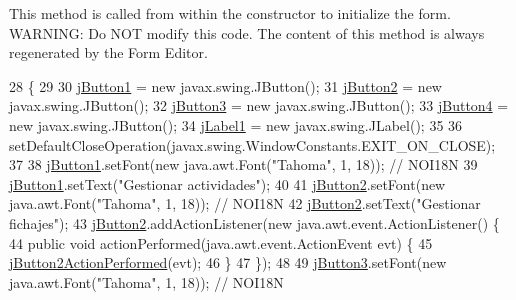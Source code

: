 This method is called from within the constructor to initialize the form. W\+A\+R\+N\+I\+NG\+: Do N\+OT modify this code. The content of this method is always regenerated by the Form Editor. 
\begin{DoxyCode}
28                                   \{
29 
30         \mbox{\hyperlink{classinterfacessoguar_1_1encargado_a5c4a8d1db3281eae3c5b8f19262b20c3}{jButton1}} = \textcolor{keyword}{new} javax.swing.JButton();
31         \mbox{\hyperlink{classinterfacessoguar_1_1encargado_a1f39888fb096cb2dd2e874f7e05f05b5}{jButton2}} = \textcolor{keyword}{new} javax.swing.JButton();
32         \mbox{\hyperlink{classinterfacessoguar_1_1encargado_a44f99cceb2a2d736508b0249e1ad447e}{jButton3}} = \textcolor{keyword}{new} javax.swing.JButton();
33         \mbox{\hyperlink{classinterfacessoguar_1_1encargado_ada21ea49d21b7b6bdd43b2a7c584450d}{jButton4}} = \textcolor{keyword}{new} javax.swing.JButton();
34         \mbox{\hyperlink{classinterfacessoguar_1_1encargado_a1b1ad6a8d2b52a465c2daf3b4409c9ed}{jLabel1}} = \textcolor{keyword}{new} javax.swing.JLabel();
35 
36         setDefaultCloseOperation(javax.swing.WindowConstants.EXIT\_ON\_CLOSE);
37 
38         \mbox{\hyperlink{classinterfacessoguar_1_1encargado_a5c4a8d1db3281eae3c5b8f19262b20c3}{jButton1}}.setFont(\textcolor{keyword}{new} java.awt.Font(\textcolor{stringliteral}{"Tahoma"}, 1, 18)); \textcolor{comment}{// NOI18N}
39         \mbox{\hyperlink{classinterfacessoguar_1_1encargado_a5c4a8d1db3281eae3c5b8f19262b20c3}{jButton1}}.setText(\textcolor{stringliteral}{"Gestionar actividades"});
40 
41         \mbox{\hyperlink{classinterfacessoguar_1_1encargado_a1f39888fb096cb2dd2e874f7e05f05b5}{jButton2}}.setFont(\textcolor{keyword}{new} java.awt.Font(\textcolor{stringliteral}{"Tahoma"}, 1, 18)); \textcolor{comment}{// NOI18N}
42         \mbox{\hyperlink{classinterfacessoguar_1_1encargado_a1f39888fb096cb2dd2e874f7e05f05b5}{jButton2}}.setText(\textcolor{stringliteral}{"Gestionar fichajes"});
43         \mbox{\hyperlink{classinterfacessoguar_1_1encargado_a1f39888fb096cb2dd2e874f7e05f05b5}{jButton2}}.addActionListener(\textcolor{keyword}{new} java.awt.event.ActionListener() \{
44             \textcolor{keyword}{public} \textcolor{keywordtype}{void} actionPerformed(java.awt.event.ActionEvent evt) \{
45                 \mbox{\hyperlink{classinterfacessoguar_1_1encargado_a4a03ba85f374b1b38e4f5c2ca80aa0cc}{jButton2ActionPerformed}}(evt);
46             \}
47         \});
48 
49         \mbox{\hyperlink{classinterfacessoguar_1_1encargado_a44f99cceb2a2d736508b0249e1ad447e}{jButton3}}.setFont(\textcolor{keyword}{new} java.awt.Font(\textcolor{stringliteral}{"Tahoma"}, 1, 18)); \textcolor{comment}{// NOI18N}

\end{DoxyCode}
